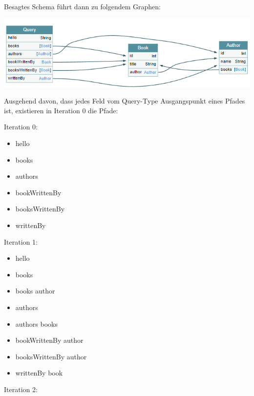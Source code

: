 Besagtes Schema führt dann zu folgendem Graphen:

\begin{center}
  \includegraphics[width=\textwidth,height=\textheight,keepaspectratio]{img/graph-paths}
\end{center}

Ausgehend davon, dass jedes Feld vom Query-Type Ausgangspunkt eines Pfades ist, existieren in Iteration 0 die Pfade:

Iteration 0:

\begin{itemize}
  \item hello
  \item books
  \item authors
  \item bookWrittenBy
  \item booksWrittenBy
  \item writtenBy
\end{itemize}

Iteration 1:

\begin{itemize}
  \item hello
  \item books
  \item books \textrightarrow author
  \item authors
  \item authors \textrightarrow books
  \item bookWrittenBy \textrightarrow author
  \item booksWrittenBy \textrightarrow author
  \item writtenBy \textrightarrow book
\end{itemize}

Iteration 2:

